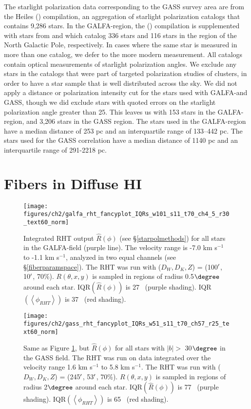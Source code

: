 The starlight polarization data corresponding to the GASS survey area are from the Heiles (\citeyear{Heiles:2000un}) compilation, an aggregation of starlight polarization catalogs that contains 9,286 stars. In the GALFA-\hi region, the \citeauthor{Heiles:2000un} (\citeyear{Heiles:2000un}) compilation is supplemented with stars from \cite{Berdyugin:2001cv} and \cite{2002A&A...384.1050B} which catalog 336 stars and 116 stars in the region of the North Galactic Pole, respectively. In cases where the same star is measured in more than one catalog, we defer to the more modern measurement. All catalogs contain optical measurements of starlight polarization angles. We exclude any stars in the catalogs that were part of targeted polarization studies of clusters, in order to have a star sample that is well distributed across the sky. We did not apply a distance or polarization intensity cut for the stars used with GALFA-\hi and GASS, though we did exclude stars with quoted errors on the starlight polarization angle greater than 25\degree. This leaves us with 153 stars in the GALFA-\hi region, and 3,206 stars in the GASS region. The stars used in the GALFA-\hi region have a median distance of 253 pc and an interquartile range of 133--442 pc.  The stars used for the GASS correlation have a median distance of 1140 pc and an interquartile range of 291-2218 pc.\\

\section{Fibers in Diffuse HI}\label{diffuse}

\begin{figure}[h!]
\centering
\texttt{[image: figures/ch2/galfa\_rht\_fancyplot\_IQRs\_w101\_s11\_t70\_ch4\_5\_r30\_text60\_norm]}
\caption{Integrated RHT output ${\hat{R}\left(\phi\right)}$ (see \S\ref{starpolmethods}) for all stars in the GALFA-\hi field (purple line). The velocity range is -7.0 km s${^{-1}}$ to -1.1 km s${^{-1}}$, analyzed in two equal channels (see \S\ref{fiberparamspace}). The RHT was run with ($D_W, D_K, Z$) = (100$\mbox{$^\prime$}$, 10$\mbox{$^\prime$}$, 70\%). $R(\theta, x, y)$ is sampled in regions of radius 0.5$\degree$ around each star.  IQR$(\hat{R}\left(\phi\right))$ is 27\degree~ (purple shading). IQR${(\left<\phi_{RHT}\right>)}$ is 37\degree~ (red shading).\label{galfamain}}
\end{figure}

\begin{figure}[h!]
\centering
\texttt{[image: figures/ch2/gass\_rht\_fancyplot\_IQRs\_w51\_s11\_t70\_ch57\_r25\_text60\_norm]}
\caption{Same as Figure \ref{galfamain}, but ${\hat{R}\left(\phi\right)}$ for all stars with ${\left| b \right| >}$ 30${\degree}$ in the GASS field. The RHT was run on data integrated over the velocity range 1.6 km s${^{-1}}$ to 5.8 km s${^{-1}}$. The RHT was run with ($D_W, D_K, Z$) = (245$\mbox{$^\prime$}$, 53$\mbox{$^\prime$}$, 70\%). $R(\theta, x, y)$ is sampled in regions of radius 2$\degree$ around each star. IQR${(\hat{R}\left(\phi\right))}$ is 77\degree~ (purple shading). IQR${(\left<\phi_{RHT}\right>)}$ is 65\degree~ (red shading).\label{gassmain}}
\end{figure}

